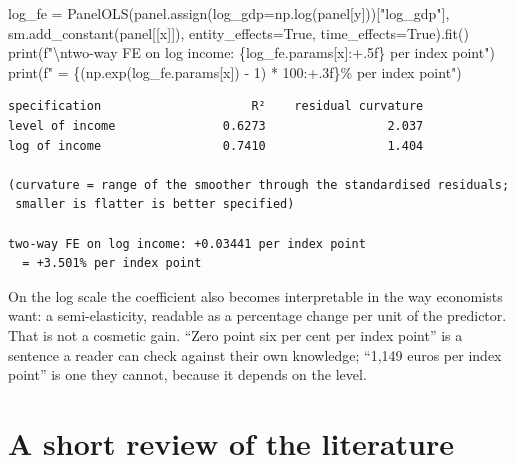 \documentclass[
  letterpaper,
  10pt,
  twoside,
  openright,
  numbers=noenddot,
  chapterprefix=true]{scrbook}
\newenvironment{Shaded}{}{}
\newcommand{\BuiltInTok}[1]{\textcolor[rgb]{0.84,0.23,0.29}{#1}}
\newcommand{\CharTok}[1]{\textcolor[rgb]{0.01,0.18,0.38}{#1}}
\newcommand{\DecValTok}[1]{\textcolor[rgb]{0.00,0.36,0.77}{#1}}
\newcommand{\NormalTok}[1]{\textcolor[rgb]{0.14,0.16,0.18}{#1}}
\newcommand{\OperatorTok}[1]{\textcolor[rgb]{0.14,0.16,0.18}{#1}}
\newcommand{\SpecialCharTok}[1]{\textcolor[rgb]{0.00,0.36,0.77}{#1}}
\newcommand{\SpecialStringTok}[1]{\textcolor[rgb]{0.01,0.18,0.38}{#1}}
\newcommand{\StringTok}[1]{\textcolor[rgb]{0.01,0.18,0.38}{#1}}
\newcommand{\VariableTok}[1]{\textcolor[rgb]{0.89,0.38,0.04}{#1}}
\begin{document}
\begin{Shaded}
\begin{Highlighting}[]
\NormalTok{log\_fe }\OperatorTok{=}\NormalTok{ PanelOLS(panel.assign(log\_gdp}\OperatorTok{=}\NormalTok{np.log(panel[y]))[}\StringTok{"log\_gdp"}\NormalTok{],}
\NormalTok{                  sm.add\_constant(panel[[x]]), entity\_effects}\OperatorTok{=}\VariableTok{True}\NormalTok{,}
\NormalTok{                  time\_effects}\OperatorTok{=}\VariableTok{True}\NormalTok{).fit()}
\BuiltInTok{print}\NormalTok{(}\SpecialStringTok{f"}\CharTok{\textbackslash{}n}\SpecialStringTok{two{-}way FE on log income: }\SpecialCharTok{\{}\NormalTok{log\_fe}\SpecialCharTok{.}\NormalTok{params[x]}\SpecialCharTok{:+.5f\}}\SpecialStringTok{ per index point"}\NormalTok{)}
\BuiltInTok{print}\NormalTok{(}\SpecialStringTok{f"  = }\SpecialCharTok{\{}\NormalTok{(np.exp(log\_fe.params[x]) }\OperatorTok{{-}} \DecValTok{1}\NormalTok{) }\OperatorTok{*} \DecValTok{100}\SpecialCharTok{:+.3f\}}\SpecialStringTok{\% per index point"}\NormalTok{)}
\end{Highlighting}
\end{Shaded}

\begin{verbatim}
specification                     R²    residual curvature
level of income               0.6273                 2.037
log of income                 0.7410                 1.404

(curvature = range of the smoother through the standardised residuals;
 smaller is flatter is better specified)

two-way FE on log income: +0.03441 per index point
  = +3.501% per index point
\end{verbatim}

On the log scale the coefficient also becomes interpretable in the way
economists want: a semi-elasticity, readable as a percentage change per
unit of the predictor. That is not a cosmetic gain. ``Zero point six per
cent per index point'' is a sentence a reader can check against their
own knowledge; ``1,149 euros per index point'' is one they cannot,
because it depends on the level.

\section{A short review of the
literature}\label{a-short-review-of-the-literature-4}
\end{document}
